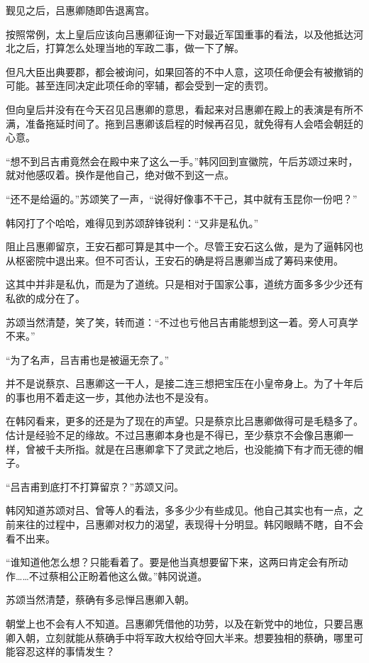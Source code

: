 觐见之后，吕惠卿随即告退离宫。

按照常例，太上皇后应该向吕惠卿征询一下对最近军国重事的看法，以及他抵达河北之后，打算怎么处理当地的军政二事，做一下了解。

但凡大臣出典要郡，都会被询问，如果回答的不中人意，这项任命便会有被撤销的可能。甚至连同决定此项任命的宰辅，都会受到一定的责罚。

但向皇后并没有在今天召见吕惠卿的意思，看起来对吕惠卿在殿上的表演是有所不满，准备拖延时间了。拖到吕惠卿该启程的时候再召见，就免得有人会唔会朝廷的心意。

“想不到吕吉甫竟然会在殿中来了这么一手。”韩冈回到宣徽院，午后苏颂过来时，就对他感叹着。换作是他自己，绝对做不到这一点。

“还不是给逼的。”苏颂笑了一声，“说得好像事不干己，其中就有玉昆你一份吧？”

韩冈打了个哈哈，难得见到苏颂辞锋锐利：“又非是私仇。”

阻止吕惠卿留京，王安石都可算是其中一个。尽管王安石这么做，是为了逼韩冈也从枢密院中退出来。但不可否认，王安石的确是将吕惠卿当成了筹码来使用。

这其中并非是私仇，而是为了道统。只是相对于国家公事，道统方面多多少少还有私欲的成分在了。

苏颂当然清楚，笑了笑，转而道：“不过也亏他吕吉甫能想到这一着。旁人可真学不来。”

“为了名声，吕吉甫也是被逼无奈了。”

并不是说蔡京、吕惠卿这一干人，是接二连三想把宝压在小皇帝身上。为了十年后的事也用不着走这一步，其他办法也不是没有。

在韩冈看来，更多的还是为了现在的声望。只是蔡京比吕惠卿做得可是毛糙多了。估计是经验不足的缘故。不过吕惠卿本身也是不得已，至少蔡京不会像吕惠卿一样，曾被千夫所指。就是在吕惠卿拿下了灵武之地后，也没能摘下有才而无德的帽子。

“吕吉甫到底打不打算留京？”苏颂又问。

韩冈知道苏颂对吕、曾等人的看法，多多少少有些成见。他自己其实也有一点，之前来往的过程中，吕惠卿对权力的渴望，表现得十分明显。韩冈眼睛不瞎，自不会看不出来。

“谁知道他怎么想？只能看着了。要是他当真想要留下来，这两曰肯定会有所动作……不过蔡相公正盼着他这么做。”韩冈说道。

苏颂当然清楚，蔡确有多忌惮吕惠卿入朝。

朝堂上也不会有人不知道。吕惠卿凭借他的功劳，以及在新党中的地位，只要吕惠卿入朝，立刻就能从蔡确手中将军政大权给夺回大半来。想要独相的蔡确，哪里可能容忍这样的事情发生？

